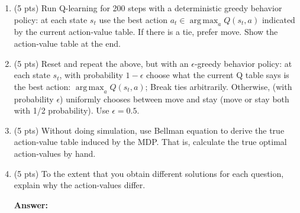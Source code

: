 \documentclass[a4paper]{article}
\theoremstyle{definition}
\DeclareMathOperator*{\argmax}{arg\,max}
\begin{document}
\begin{enumerate}
\item (5 pts) Run Q-learning for 200 steps with a deterministic greedy behavior policy: at each state $s_t$ use the best action $a_t \in \argmax_a Q(s_t,a)$ indicated by the current action-value table. If there is a tie, prefer move. Show the action-value table at the end.

\item (5 pts) Reset and repeat the above, but with an $\epsilon$-greedy behavior policy: at each state $s_t$, with probability $1-\epsilon$ choose what the current Q table says is the best action: $\argmax_a Q(s_t,a)$; Break ties arbitrarily. Otherwise, (with probability $\epsilon$) uniformly chooses between move and stay (move or stay both with 1/2 probability). Use $\epsilon=0.5$.

\item (5 pts) Without doing simulation, use Bellman equation to derive the true action-value table induced by the MDP. That is, calculate the true optimal action-values by hand.

\item (5 pts) To the extent that you obtain different solutions for each question, explain why the action-values  differ.


\textbf{Answer:}
\begin{enumerate}
    

\end{enumerate}
\end{enumerate}
\end{document}

